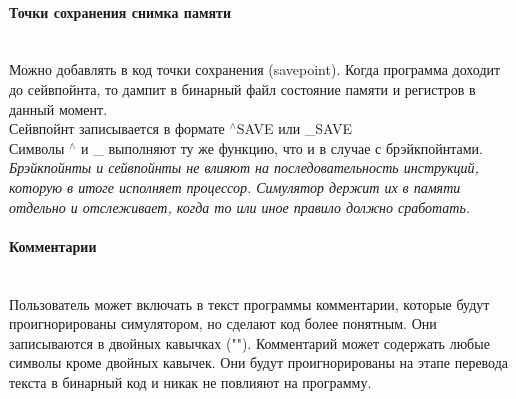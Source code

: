 \paragraph{Точки сохранения снимка памяти}~\\
Можно добавлять в код точки сохранения (savepoint). Когда программа доходит до сейвпойнта, то дампит в бинарный файл состояние памяти и регистров в данный момент.\\
Сейвпойнт записывается в формате $^\wedge$SAVE или \_SAVE \\
Символы $^\wedge$ и \_ выполняют ту же функцию, что и в случае с брэйкпойнтами. \\

{ \it \large
Брэйкпойнты и сейвпойнты не влияют на последовательность инструкций, которую в итоге исполняет процессор. Симулятор держит их в памяти отдельно и отслеживает, когда то или иное правило должно сработать.
}
\\

\paragraph{Комментарии}~\\
Пользователь может включать в текст программы комментарии, которые будут проигнорированы симулятором, но сделают код более понятным. Они записываются в двойных кавычках ("\space"). Комментарий может содержать любые символы кроме двойных кавычек.
Они будут проигнорированы на этапе перевода текста в бинарный код и никак не повлияют на программу.


